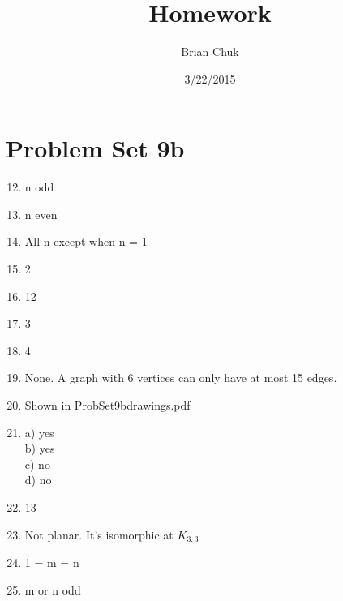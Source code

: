 \documentclass[11pt]{article}
\title{\textbf{Homework}}
\author{Brian Chuk}
\date{3/22/2015}
\begin{document}
\maketitle

\section{Problem Set 9b}
\begin{enumerate}
\setcounter{enumi}{11}
\item n odd
\item n even
\item All n except when n = 1
\item 2
\item 12
\item 3
\item 4
\setcounter{enumi}{25}
\item None. A graph with 6 vertices can only have at most 15 edges.
\item Shown in ProbSet9bdrawings.pdf
\setcounter{enumi}{32}
\item a) yes\\
	b) yes\\
	c) no\\
	d) no
\item 13
\item Not planar. It's isomorphic at $K_{3,3}$
\setcounter{enumi}{38}
\item 1 = m = n
\item m or n odd
\end{enumerate}
\end{document}
